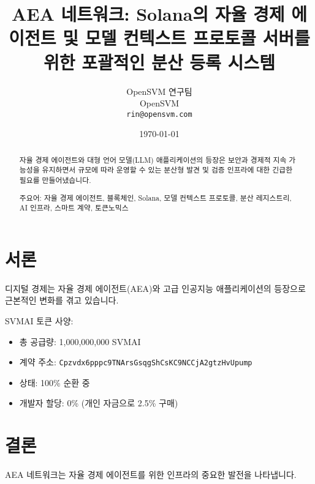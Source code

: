 \documentclass[12pt,a4paper]{article}
\title{AEA 네트워크: Solana의 자율 경제 에이전트 및 모델 컨텍스트 프로토콜 서버를 위한 포괄적인 분산 등록 시스템}
\author{OpenSVM 연구팀 \\ OpenSVM \\ \texttt{rin@opensvm.com}}
\date{\today}
\begin{document}
\maketitle

\begin{abstract}
자율 경제 에이전트와 대형 언어 모델(LLM) 애플리케이션의 등장은 보안과 경제적 지속 가능성을 유지하면서 규모에 따라 운영할 수 있는 분산형 발견 및 검증 인프라에 대한 긴급한 필요를 만들어냈습니다.

주요어: 자율 경제 에이전트, 블록체인, Solana, 모델 컨텍스트 프로토콜, 분산 레지스트리, AI 인프라, 스마트 계약, 토큰노믹스
\end{abstract}

\section{서론}
디지털 경제는 자율 경제 에이전트(AEA)와 고급 인공지능 애플리케이션의 등장으로 근본적인 변화를 겪고 있습니다.

SVMAI 토큰 사양:
\begin{itemize}
\item 총 공급량: 1,000,000,000 SVMAI
\item 계약 주소: \texttt{Cpzvdx6pppc9TNArsGsqgShCsKC9NCCjA2gtzHvUpump}
\item 상태: 100\% 순환 중
\item 개발자 할당: 0\% (개인 자금으로 2.5\% 구매)
\end{itemize}

\section{결론}
AEA 네트워크는 자율 경제 에이전트를 위한 인프라의 중요한 발전을 나타냅니다.
\end{document}

